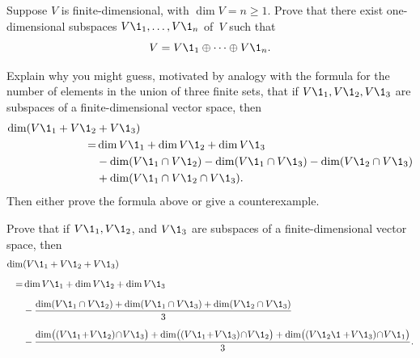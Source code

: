 \exercise
Suppose $V$ is finite-dimensional, with $\dim V = n \ge 1$.  Prove that there
exist one-dimensional subspaces $V\1_1, \dots, V\1_n$ of~$V$ such that \label{8exer}
\[
V = V\1_1 \oplus \dots \oplus V\1_n.
\]
\exercisedisplayend

\exercise
Explain why you might guess, motivated by analogy with the formula for the number of elements in the
union of three finite sets, that if $V\1_1, V\1_2, V\1_3$ are subspaces
of a finite-dimensional vector space, then
\begin{align*}
\dim(V\1_1 + V\1_2 &+ V\1_3)\\
=&\dim V\1_1 + \dim V\1_2 + \dim V\1_3 \\
&{} - \dim (V\1_1 \cap V\1_2) - \dim (V\1_1 \cap V\1_3) - \dim (V\1_2 \cap V\1_3) \\
&+ \dim (V\1_1 \cap V\1_2 \cap V\1_3).
\end{align*}
Then either prove the formula above or give a counterexample.


\exercise
Prove that if $V\1_1, V\1_2$, and $V\1_3$ are subspaces of a finite-dimensional vector space, then
\begin{align*}
\dim&(V\1_1 + V\1_2+ V\1_3) \\[6bp]
= & \dim V\1_1 + \dim V\1_2 + \dim V\1_3\\[6bp]
&- \frac{ \dim(V\1_1 \cap V\1_2) + \dim(V\1_1 \cap V\1_3) + \dim(V\1_2 \cap V\1_3) }{3}\\[6bp]
&- \frac{ \dim\bigl( (V\1_1\! +\! V\1_2)\! \cap\! V\1_3 \bigr)
+ \dim\bigl( (V\1_1 \!+\! V\1_3)\! \cap\! V\1_2 \bigr)
+ \dim\bigl( (V\1_2\1 +\! V\1_3)\! \cap\! V\1_1 \bigr) }{3}.
\end{align*}


